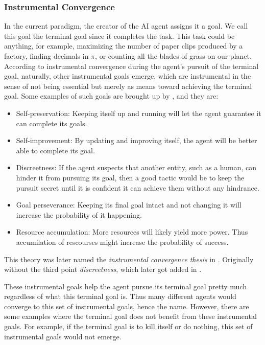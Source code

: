 \documentclass[12pt,A4]{report}
\theoremstyle{definition}
\begin{document}
\subsubsection{Instrumental Convergence}
In the current paradigm, the creator of the AI agent assigns it a goal. We call this goal the terminal goal since it completes the task. This task could be anything, for example, maximizing the number of paper clips produced by a factory, finding decimals in $\pi$, or counting all the blades of grass on our planet. According to instrumental convergence during the agent's pursuit of the terminal goal, naturally, other instrumental goals emerge, which are instrumental in the sense of not being essential but merely as means toward achieving the terminal goal. Some examples of such goals are brought up by \citet{Omohundro08}, and they are: 
\begin{itemize}
    \item Self-preservation: Keeping itself up and running will let the agent guarantee it can complete its goals.
    \item Self-improvement: By updating and improving itself, the agent will be better able to complete its goal.
    \item Discreetness: If the agent suspects that another entity, such as a human, can hinder it from pursuing its goal, then a good tactic would be to keep the pursuit secret until it is confident it can achieve them without any hindrance. 
    \item Goal perseverance: Keeping its final goal intact and not changing it will increase the probability of it happening. 
    \item Resource accumulation: More resources will likely yield more power. Thus accumilation of rescourses might increase the probability of success.
\end{itemize}
This theory was later named the \textit{instrumental convergence thesis} in \citet{Bostrom12}. Originally without the third point \textit{discreetness}, which later got added in \citet{Bostrom14}.

These instrumental goals help the agent pursue its terminal goal pretty much regardless of what this terminal goal is. Thus many different agents would converge to this set of instrumental goals, hence the name. However, there are some examples where the terminal goal does not benefit from these instrumental goals. For example, if the terminal goal is to kill itself or do nothing, this set of instrumental goals would not emerge. 
\end{document}
